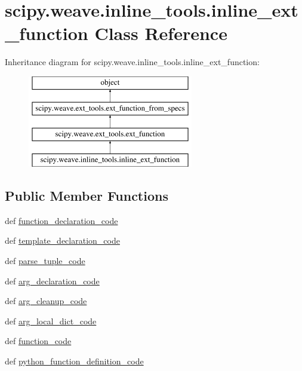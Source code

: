 \hypertarget{classscipy_1_1weave_1_1inline__tools_1_1inline__ext__function}{}\section{scipy.\+weave.\+inline\+\_\+tools.\+inline\+\_\+ext\+\_\+function Class Reference}
\label{classscipy_1_1weave_1_1inline__tools_1_1inline__ext__function}
Inheritance diagram for scipy.\+weave.\+inline\+\_\+tools.\+inline\+\_\+ext\+\_\+function\+:\begin{figure}[H]
\begin{center}
\leavevmode
\includegraphics[height=4.000000cm]{classscipy_1_1weave_1_1inline__tools_1_1inline__ext__function}
\end{center}
\end{figure}
\subsection*{Public Member Functions}
\begin{DoxyCompactItemize}
\item 
def \hyperlink{classscipy_1_1weave_1_1inline__tools_1_1inline__ext__function_a7679dbddde45200973981bb51af99616}{function\+\_\+declaration\+\_\+code}
\item 
def \hyperlink{classscipy_1_1weave_1_1inline__tools_1_1inline__ext__function_a1ccf809cc57fa2b878ae86ac2a2950b6}{template\+\_\+declaration\+\_\+code}
\item 
def \hyperlink{classscipy_1_1weave_1_1inline__tools_1_1inline__ext__function_add64cf7d42a6ab2ae628297ea76ba3f1}{parse\+\_\+tuple\+\_\+code}
\item 
def \hyperlink{classscipy_1_1weave_1_1inline__tools_1_1inline__ext__function_a52347556ad9ebd29dbe5d3b7999196a8}{arg\+\_\+declaration\+\_\+code}
\item 
def \hyperlink{classscipy_1_1weave_1_1inline__tools_1_1inline__ext__function_a18f605ee4a480f6d6d748c86929dc407}{arg\+\_\+cleanup\+\_\+code}
\item 
def \hyperlink{classscipy_1_1weave_1_1inline__tools_1_1inline__ext__function_abe7488e370a047e03d3f1a4579cf1a1c}{arg\+\_\+local\+\_\+dict\+\_\+code}
\item 
def \hyperlink{classscipy_1_1weave_1_1inline__tools_1_1inline__ext__function_ad0b3cf561dc3f8483e81191146783174}{function\+\_\+code}
\item 
def \hyperlink{classscipy_1_1weave_1_1inline__tools_1_1inline__ext__function_a1875d5ea0250afa253fce3b3ea18c2b6}{python\+\_\+function\+\_\+definition\+\_\+code}
\end{DoxyCompactItemize}
